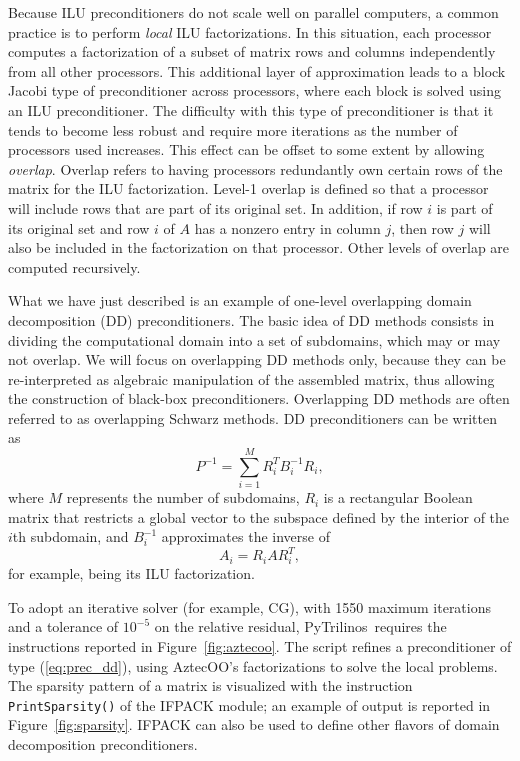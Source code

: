 \documentclass[acmtocl]{acmtrans2m}
\newcommand{\PyTrilinos}{{PyTrilinos}}
\begin{document}
Because ILU preconditioners do not scale well on parallel computers, a
common practice is to perform {\em local} ILU factorizations.  In this
situation, each processor computes a factorization of a subset of
matrix rows and columns independently from all other processors.  This
additional layer of approximation leads to a block Jacobi type of
preconditioner across processors, where each block is solved using an
ILU preconditioner.  The difficulty with this type of preconditioner
is that it tends to become less robust and require more iterations as
the number of processors used increases.  This effect can be offset to
some extent by allowing {\em overlap}.  Overlap refers to having
processors redundantly own certain rows of the matrix for the ILU
factorization.  Level-1 overlap is defined so that a processor will
include rows that are part of its original set.  In addition, if row
$i$ is part of its original set and row $i$ of $A$ has a nonzero entry
in column $j$, then row $j$ will also be included in the factorization
on that processor.  Other levels of overlap are computed recursively.

What we have just described is an example of one-level overlapping
domain decomposition (DD) preconditioners.  The basic idea of DD
methods consists in dividing the computational domain into a set of
subdomains, which may or may not overlap. We will focus on overlapping
DD methods only, because they can be re-interpreted as algebraic
manipulation of the assembled matrix, thus allowing the construction
of black-box preconditioners. Overlapping DD methods are often
referred to as overlapping Schwarz methods. DD preconditioners can be
written as
\begin{equation}
  \label{eq:prec_dd}
  P^{-1} = \sum_{i=1}^M R_i^T B_i^{-1} R_i,
\end{equation}
where $M$ represents the number of subdomains, $R_i$ is a rectangular
Boolean matrix that restricts a global vector to the subspace defined
by the interior of the $i$th subdomain, and $B_i^{-1}$ approximates the
inverse of
\begin{equation}
  \label{eq:aztecoo_tilde_a}
  A_i = R_i A R_i^T ,
\end{equation}
for example, being its ILU factorization.

\medskip

To adopt an iterative solver (for example, CG),
with 1550 maximum iterations and a tolerance of $10^{-5}$ on the
relative residual, \PyTrilinos\ requires the instructions reported in
Figure~\ref{fig:aztecoo}. The script refines a preconditioner of type
(\ref{eq:prec_dd}), using AztecOO's factorizations to solve the local
problems. The sparsity pattern of a matrix is visualized
with the instruction \verb!PrintSparsity()! of the IFPACK module;
an example of output is reported in
Figure~\ref{fig:sparsity}. IFPACK can
also be used to define other flavors of domain decomposition preconditioners.
\end{document}
